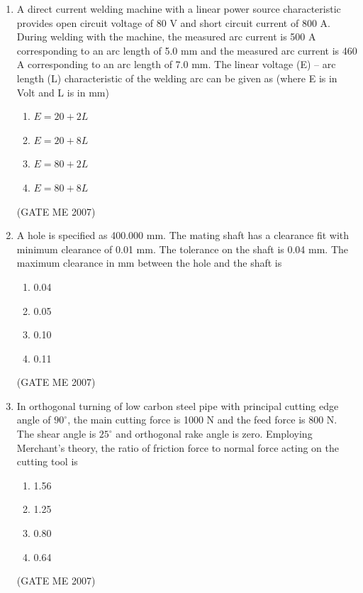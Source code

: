\documentclass[journal]{IEEEtran}
\begin{document}
\begin{enumerate}
\item A direct current welding machine with a linear power source characteristic provides open circuit voltage of 80 V and short circuit current of 800 A. During welding with the machine, the measured arc current is 500 A corresponding to an arc length of 5.0 mm and the measured arc current is 460 A corresponding to an arc length of 7.0 mm. The linear voltage (E) – arc length (L) characteristic of the welding arc can be given as (where E is in Volt and L is in mm)
\begin{multicols}{4}
\begin{enumerate}
\item \( E = 20 + 2L \)
\item \( E = 20 + 8L \)
\item \( E = 80 + 2L \)
\item \( E = 80 + 8L \)
\end{enumerate}
\end{multicols}
\hfill (GATE ME 2007)

\item A hole is specified as 400.000 mm. The mating shaft has a clearance fit with minimum clearance of 0.01 mm. The tolerance on the shaft is 0.04 mm. The maximum clearance in mm between the hole and the shaft is
\begin{multicols}{4}
\begin{enumerate}
\item 0.04
\item 0.05
\item 0.10
\item 0.11
\end{enumerate}
\end{multicols}
\hfill (GATE ME 2007)

\item In orthogonal turning of low carbon steel pipe with principal cutting edge angle of \( 90^\circ \), the main cutting force is 1000 N and the feed force is 800 N. The shear angle is \( 25^\circ \) and orthogonal rake angle is zero. Employing Merchant’s theory, the ratio of friction force to normal force acting on the cutting tool is
\begin{multicols}{4}
\begin{enumerate}
\item 1.56
\item 1.25
\item 0.80
\item 0.64
\end{enumerate}
\end{multicols}
\hfill (GATE ME 2007)


\end{enumerate}
\end{document}
